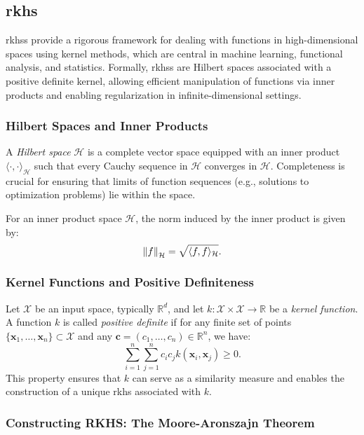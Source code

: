 \subsection{\acf{rkhs}}
\label{background:rkhs}
\acp{rkhs} provide a rigorous framework for dealing with functions in high-dimensional spaces using kernel methods, which are central in machine learning, functional analysis, and statistics. Formally, \acp{rkhs} are Hilbert spaces associated with a positive definite kernel, allowing efficient manipulation of functions via inner products and enabling regularization in infinite-dimensional settings.

\subsubsection{Hilbert Spaces and Inner Products}

A \textit{Hilbert space} $\mathcal{H}$ is a complete vector space equipped with an inner product $\langle \cdot, \cdot \rangle_{\mathcal{H}}$ such that every Cauchy sequence in $\mathcal{H}$ converges in $\mathcal{H}$. Completeness is crucial for ensuring that limits of function sequences (e.g., solutions to optimization problems) lie within the space.

For an inner product space $\mathcal{H}$, the norm induced by the inner product is given by:
\[
\norm{f}_{\mathcal{H}} = \sqrt{\langle f, f \rangle_{\mathcal{H}}}.
\]

\subsubsection{Kernel Functions and Positive Definiteness}

Let $\mathcal{X}$ be an input space, typically $\mathbb{R}^d$, and let $k: \mathcal{X} \times \mathcal{X} \to \mathbb{R}$ be a \textit{kernel function}. A function $k$ is called \textit{positive definite} if for any finite set of points $\{\mathbf{x}_1, \dots, \mathbf{x}_n\} \subset \mathcal{X}$ and any $\mathbf{c} = (c_1, \dots, c_n) \in \mathbb{R}^n$, we have:
\[
\sum_{i=1}^n \sum_{j=1}^n c_i c_j k(\mathbf{x}_i, \mathbf{x}_j) \geq 0.
\]
This property ensures that $k$ can serve as a similarity measure and enables the construction of a unique \ac{rkhs} associated with $k$.

\subsubsection{Constructing RKHS: The Moore-Aronszajn Theorem}

